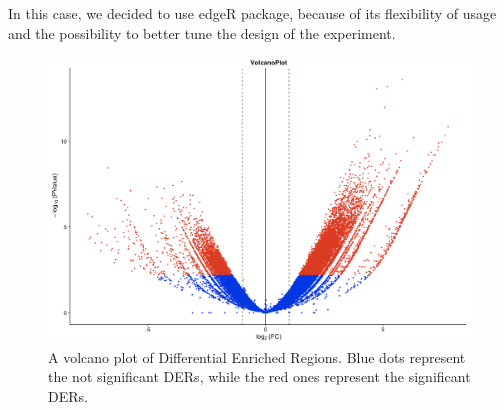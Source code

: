 In this case, we decided to use edgeR package, because of its flexibility of usage and the possibility to better tune the design of the experiment.

\begin{figure}[H]
\centering
\includegraphics[width=\textwidth, height=\textheight, keepaspectratio]{img/descan2/DE_peaks.png}
\caption[Differential Enrichment Regions Volcano]{A volcano plot of Differential Enriched Regions. Blue dots represent the not significant DERs, while the red ones represent the significant DERs.}
\label{fig:depeaksdescan}
\centering
\end{figure}

